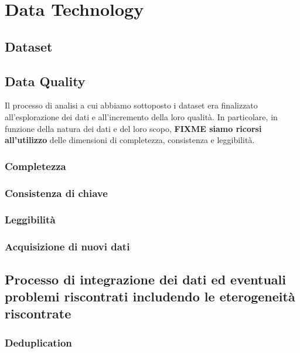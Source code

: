 \setcounter{chapter}{0}

\part{Data Technology}

\chapter{Dataset}

\chapter{Data Quality}
Il processo di analisi a cui abbiamo sottoposto i dataset era finalizzato 
all'esplorazione dei dati e all'incremento della loro qualità. In particolare, 
in funzione della natura dei dati e del loro scopo, \textbf{FIXME siamo ricorsi 
all'utilizzo} delle dimensioni di completezza, consistenza e leggibilità.


\section{Completezza}

\section{Consistenza di chiave}

\section{Leggibilità}

\section{Acquisizione di nuovi dati}

\chapter{Processo di integrazione dei dati ed eventuali problemi riscontrati includendo le eterogeneità riscontrate}

\section{Deduplication}

